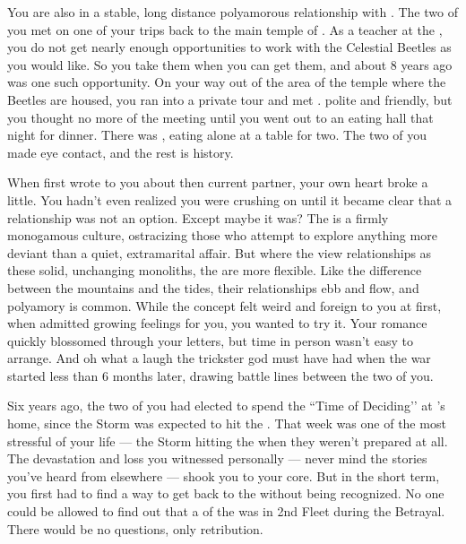 \documentclass[char]{GL2020}
\begin{document}
You are also in a stable, long distance polyamorous relationship with \cJuniorStatesman{\full}. The two of you met on one of your trips back to the main temple of \cTechGod{}. As a teacher at the \pSchool{}, you do not get nearly enough opportunities to work with the Celestial Beetles as you would like. So you take them when you can get them, and about 8 years ago was one such opportunity. On your way out of the area of the temple where the Beetles are housed, you ran into a private tour and met \cJuniorStatesman{}. \cJuniorStatesman{\Theywere} polite and friendly, but you thought no more of the meeting until you went out to an eating hall that night for dinner. There was \cJuniorStatesman{}, eating alone at a table for two. The two of you made eye contact, and the rest is history. 

When \cJuniorStatesman{} first wrote to you about \cJuniorStatesman{\their} then current partner, your own heart broke a little. You hadn’t even realized you were crushing on \cJuniorStatesman{\them} until it became clear that a relationship was not an option. Except maybe it was? The \pTech{} is a firmly monogamous culture, ostracizing those who attempt to explore anything more deviant than a quiet, extramarital affair. But where the \pTech{} view relationships as these solid, unchanging monoliths, the \pShippies{} are more flexible. Like the difference between the mountains and the tides, their relationships ebb and flow, and polyamory is common. While the concept felt weird and foreign to you at first, when \cJuniorStatesman{} admitted \cJuniorStatesman{\their} growing feelings for you, you wanted to try it. Your romance quickly blossomed through your letters, but time in person wasn’t easy to arrange. And oh what a laugh the trickster god must have had when the war started less than 6 months later, drawing battle lines between the two of you. 

Six years ago, the two of you had elected to spend the ``Time of Deciding’’ at \cJuniorStatesman{}’s home, since the Storm was expected to hit the \pTech{}. That week was one of the most stressful of your life — the Storm hitting the \pShip{} when they weren’t prepared at all. The devastation and loss you witnessed personally — never mind the stories you’ve heard from elsewhere — shook you to your core. But in the short term, you first had to find a way to get back to the \pSchool{} without being recognized. No one could be allowed to find out that a \cBeetle{\cleric} of the \pTech{} was in 2nd Fleet during the Betrayal. There would be no questions, only retribution.
\end{document}
